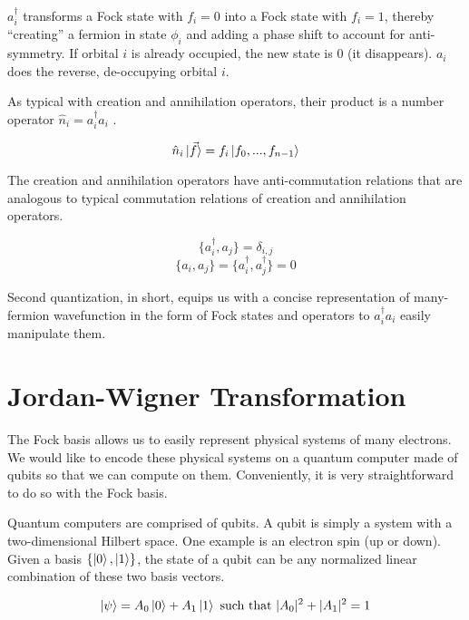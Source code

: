 $a^\dag_i$ transforms a Fock state with $f_i = 0$ into a Fock state with $f_i = 1$, thereby ``creating'' a fermion in state $\phi_i$ and adding a phase shift to account for anti-symmetry. If orbital $i$ is already occupied, the new state is $0$ (it disappears). $a_i$ does the reverse, de-occupying orbital $i$.

As typical with creation and annihilation operators, their product is a number operator $\hat{n}_i = a^\dag_ia_i$ \cite{QCC}.

\begin{equation}
    \hat{n}_i\ket{\vec{f}} = f_i\ket{f_0, ..., f_{n - 1}}
\end{equation}

The creation and annihilation operators have anti-commutation relations \cite{QCC} that are analogous to typical commutation relations of creation and annihilation operators.

\begin{equation}
    \{a^\dag_i, a_j\} = \delta_{i, j}
\end{equation}
\begin{equation}
    \{a_i, a_j\} = \{a^\dag_i, a^\dag_j\} = 0
\end{equation}

Second quantization, in short, equips us with a concise representation of many-fermion wavefunction in the form of Fock states and operators to $a^\dag_ia_i$ easily manipulate them.

\section{Jordan-Wigner Transformation}

The Fock basis allows us to easily represent physical systems of many electrons. We would like to encode these physical systems on a quantum computer made of qubits so that we can compute on them. Conveniently, it is very straightforward to do so with the Fock basis.

Quantum computers are comprised of qubits. A qubit is simply a system with a two-dimensional Hilbert space. One example is an electron spin (up or down). Given a basis $\{\ket{0}, \ket{1}\}$, the state of a qubit can be any normalized linear combination of these two basis vectors.

\begin{equation}
    \ket{\psi} = A_0\ket{0} + A_1\ket{1} \text{ such that } |A_0|^2 + |A_1|^2 = 1
\end{equation}

